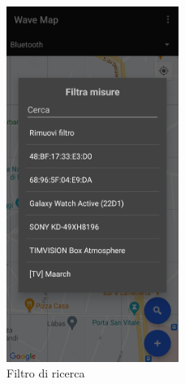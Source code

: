 \documentclass[11pt]{article}
\begin{document}
\begin{minipage}[b]{0.45\textwidth}
  \begin{figure}[H]
    \centering
    \includegraphics[width=0.50\textwidth]{./img/overview/query.jpg}
    \caption{Filtro di ricerca} \label{fig:query}
  \end{figure}
\end{minipage}
\hfill
\end{document}
